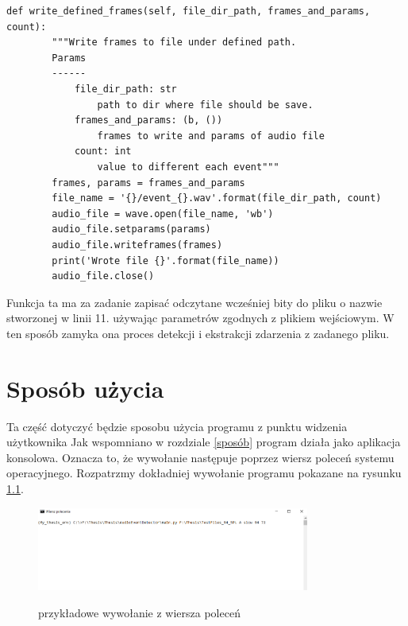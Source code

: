 \documentclass[eng,printmode]{mgr}
\begin{document}
\begin{minipage}{\linewidth}
\begin{lstlisting}[caption={fragment kodu źródłowego pliku WaveReader.py,\newline klasa WaveWriter. metoda write\_defined\_frames },captionpos=b,label={writedefinedframes}] 
    def write_defined_frames(self, file_dir_path, frames_and_params, count):
        """Write frames to file under defined path.
        Params
        ------
            file_dir_path: str
                path to dir where file should be save.
            frames_and_params: (b, ())
                frames to write and params of audio file
            count: int
                value to different each event"""
        frames, params = frames_and_params
        file_name = '{}/event_{}.wav'.format(file_dir_path, count)
        audio_file = wave.open(file_name, 'wb')
        audio_file.setparams(params)
        audio_file.writeframes(frames)
        print('Wrote file {}'.format(file_name))
        audio_file.close()
\end{lstlisting}
\end{minipage}
Funkcja ta ma za zadanie zapisać odczytane wcześniej bity do pliku o nazwie stworzonej w linii 11. używając parametrów zgodnych z plikiem wejściowym. 
W ten sposób zamyka ona proces detekcji i ekstrakcji zdarzenia z zadanego pliku. 


\chapter{Sposób użycia}
Ta część dotyczyć będzie sposobu użycia programu z punktu widzenia użytkownika
Jak wspomniano w rozdziale \ref{sposób} program działa jako aplikacja konsolowa. Oznacza to, że wywołanie następuje poprzez wiersz poleceń systemu operacyjnego. Rozpatrzmy dokładniej wywołanie programu pokazane na rysunku \ref{cmd}.

\begin{figure}[hbtp]
\caption{przykładowe wywołanie z wiersza poleceń}
\centering
\includegraphics[width=0.8\textwidth]{cmd_wywolanie_2.PNG}
\label{cmd}
\end{figure}
\end{document}
